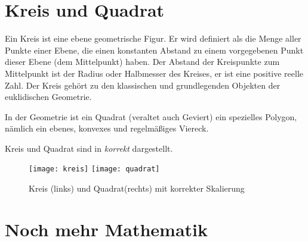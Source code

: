 \section{Kreis und Quadrat}
Ein Kreis ist eine ebene geometrische Figur. Er wird definiert als die
Menge aller Punkte einer Ebene, die einen konstanten Abstand zu einem
vorgegebenen Punkt dieser Ebene (dem Mittelpunkt) haben. Der Abstand
der Kreispunkte zum Mittelpunkt ist der Radius oder Halbmesser des
Kreises, er ist eine positive reelle Zahl. Der Kreis gehört zu den
klassischen und grundlegenden Objekten der euklidischen Geometrie.

In der Geometrie ist ein Quadrat (veraltet auch Geviert) ein
spezielles Polygon, nämlich ein ebenes, konvexes und regelmäßiges
Viereck.

Kreis und Quadrat sind in 
\emph{korrekt} dargestellt.
%
\begin{figure}[ht]
  \centering
  \texttt{[image: kreis]}
  \texttt{[image: quadrat]}
  \caption[Kreis und Quadrat]{Kreis (links) und Quadrat(rechts) mit korrekter Skalierung}
  \label{fig:kreis_quadrat}
\end{figure}
%
\section{Noch mehr Mathematik}
\blindmathtrue
\blindtext[5]
\blindmathfalse